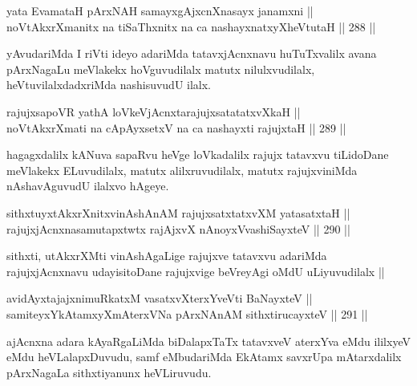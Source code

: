 \begin{shl}
yata EvamataH pArxNAH samayxgAjxcnXnasayx janamxni || \\
noVtAkxrXmanitx na tiSaThxnitx na ca nashayxnatxyXheVtutaH \hfill || 288 ||  
\end{shl}

\begin{artha}
yAvudariMda I riVti ideyo adariMda tatavxjAcnxnavu huTuTxvalilx avana
pArxNagaLu meVlakekx hoVguvudilalx matutx nilulxvudilalx,
heVtuvilalxdadxriMda nashisuvudU ilalx.
\end{artha}

\begin{shl}
rajujxsapoVR yathA loVkeV\s jAcnxtarajujxsatatatxvXkaH || \\
noVtAkxrXmati na cApAyxsetxV na ca nashayxti rajujxtaH \hfill || 289 ||  
\end{shl}

\begin{artha}
hagagxdalilx kANuva sapaRvu heVge loVkadalilx rajujx tatavxvu
tiLidoDane meVlakekx ELuvudilalx, matutx alilxruvudilalx, matutx
rajujxviniMda nAshavAguvudU ilalxvo hAgeye.
\end{artha}

\begin{shl}
sithxtuyxtAkxrXnitxvinAshAnAM rajujxsatxtatxvXM yatasatxtaH || \\
rajujxjAcnxnasamutapxtwtx rajAjxvX nAnoyxV\s vashiSayxteV \hfill || 290 ||  
\end{shl}

\begin{artha}
sithxti, utAkxrXMti vinAshAgaLige rajujxve tatavxvu adariMda
rajujxjAcnxnavu udayisitoDane rajujxvige beVreyAgi oMdU uLiyuvudilalx ||
\end{artha}


\begin{shl}
avidAyxtajajxnimuRkatxM vasatxvXterxYveVti BaNayxteV || \\
samiteyxYkAtamxyXmAterxVNa pArxNAnAM sithxtirucayxteV \hfill || 291 ||  
\end{shl}	

\begin{artha}
ajAcnxna adara kAyaRgaLiMda biDalapxTaTx tatavxveV aterxYva eMdu
ililxyeV eMdu heVLalapxDuvudu, samf eMbudariMda EkAtamx savxrUpa
mAtarxdalilx pArxNagaLa sithxtiyanunx heVLiruvudu.
\end{artha}

